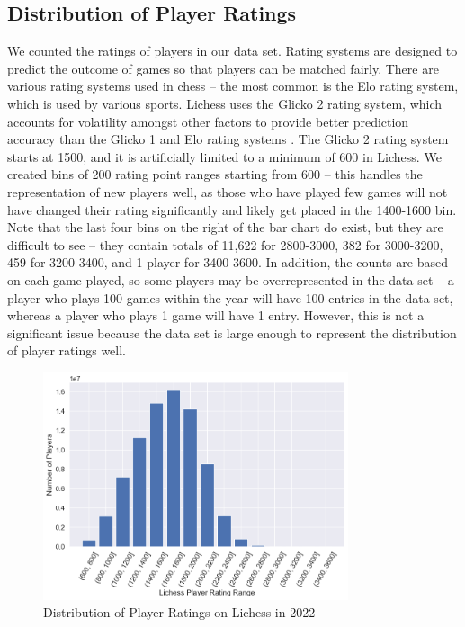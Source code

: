 \documentclass[a4paper, 11pt]{article}
\begin{document}
\subsection{Distribution of Player Ratings}
We counted the ratings of players in our data set. Rating systems are designed to predict the outcome of games so that players can be matched fairly. There are various rating systems used in chess -- the most common is the Elo rating system, which is used by various sports. Lichess uses the Glicko 2 rating system, which accounts for volatility amongst other factors to provide better prediction accuracy than the Glicko 1 and Elo rating systems \cite{chessRatingSystems, DeloitteFIDEChessRatingChallenge}. The Glicko 2 rating system starts at 1500, and it is artificially limited to a minimum of 600 in Lichess. We created bins of 200 rating point ranges starting from 600 -- this handles the representation of new players well, as those who have played few games will not have changed their rating significantly and likely get placed in the 1400-1600 bin. Note that the last four bins on the right of the bar chart do exist, but they are difficult to see -- they contain totals of 11,622 for 2800-3000, 382 for 3000-3200, 459 for 3200-3400, and 1 player for 3400-3600. In addition, the counts are based on each game played, so some players may be overrepresented in the data set -- a player who plays 100 games within the year will have 100 entries in the data set, whereas a player who plays 1 game will have 1 entry. However, this is not a significant issue because the data set is large enough to represent the distribution of player ratings well.

\begin{figure}[H]
    \centering
    \caption{Distribution of Player Ratings on Lichess in 2022}
    \label{fig:distributionOfPlayerRatings}
    \includegraphics[width=0.8\textwidth]{Distribution of Player Ratings.png}
\end{figure}
\end{document}
